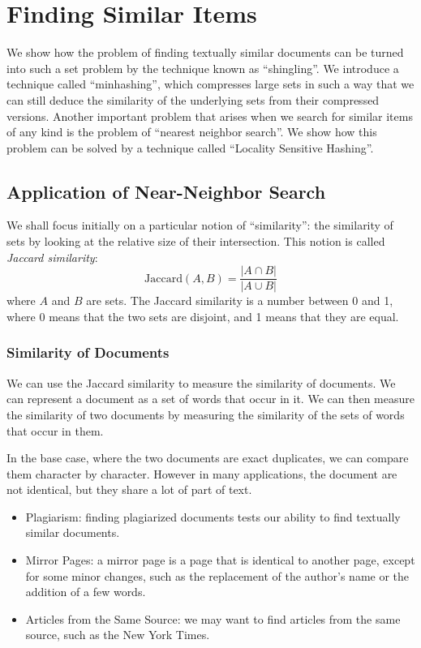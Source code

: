 \chapter{Finding Similar Items}\label{ch:finding-similar-items}

We show how the problem of finding textually similar documents can be turned into such a set problem by the technique known as ``shingling''. We introduce a technique called ``minhashing'', which compresses large sets in such a way that we can still deduce the similarity of the underlying sets from their compressed versions. Another important problem that arises when we search for similar items of any kind is the problem of ``nearest neighbor search''. We show how this problem can be solved by a technique called ``Locality Sensitive Hashing''. 

\section{Application of Near-Neighbor Search}\label{sec:application-of-near-neighbor-search}

We shall focus initially on a particular notion of ``similarity'': the similarity of sets by looking at the relative size of their intersection. This notion is called \textit{Jaccard similarity}:
\begin{equation*}
    \text{Jaccard}(A, B) = \frac{|A \cap B|}{|A \cup B|}
\end{equation*}
where $A$ and $B$ are sets. The Jaccard similarity is a number between 0 and 1, where 0 means that the two sets are disjoint, and 1 means that they are equal.

\subsection{Similarity of Documents}\label{subsec:similarity-of-documents}

We can use the Jaccard similarity to measure the similarity of documents. We can represent a document as a set of words that occur in it. We can then measure the similarity of two documents by measuring the similarity of the sets of words that occur in them.

In the base case, where the two documents are exact duplicates, we can compare them character by character. However in many applications, the document are not identical, but they share a lot of part of text.

\begin{itemize}
    \item Plagiarism: finding plagiarized documents tests our ability to find textually similar documents.
    \item Mirror Pages: a mirror page is a page that is identical to another page, except for some minor changes, such as the replacement of the author's name or the addition of a few words.
    \item Articles from the Same Source: we may want to find articles from the same source, such as the New York Times.
\end{itemize}

